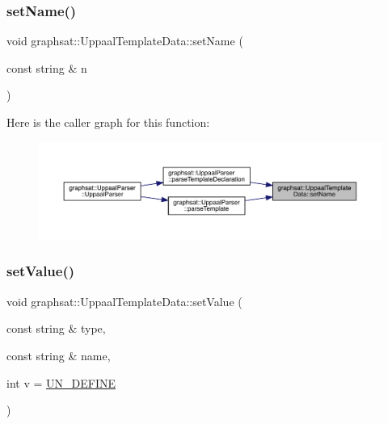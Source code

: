 \subsubsection{\texorpdfstring{setName()}{setName()}}
{\footnotesize\ttfamily void graphsat\+::\+Uppaal\+Template\+Data\+::set\+Name (\begin{DoxyParamCaption}\item[{const string \&}]{n }\end{DoxyParamCaption})\hspace{0.3cm}{\ttfamily [inline]}}

Here is the caller graph for this function\+:
\nopagebreak
\begin{figure}[H]
\begin{center}
\leavevmode
\includegraphics[width=350pt]{classgraphsat_1_1_uppaal_template_data_aa2b446cbeeba08745805811e07e9d45b_icgraph}
\end{center}
\end{figure}
\mbox{\label{classgraphsat_1_1_uppaal_template_data_ac06f0426517095016aaa34fe0b933ff1}} 
\subsubsection{\texorpdfstring{setValue()}{setValue()}}
{\footnotesize\ttfamily void graphsat\+::\+Uppaal\+Template\+Data\+::set\+Value (\begin{DoxyParamCaption}\item[{const string \&}]{type,  }\item[{const string \&}]{name,  }\item[{int}]{v = {\ttfamily \mbox{\hyperlink{namespacegraphsat_ac495a5bfce375af1b4d9a8e3f75bef9e}{U\+N\+\_\+\+D\+E\+F\+I\+NE}}} }\end{DoxyParamCaption})\hspace{0.3cm}{\ttfamily [inline]}}

